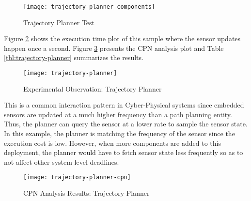 \begin{figure}[h]
	\centering
	\texttt{[image: trajectory-planner-components]}
	\caption{Trajectory Planner Test}
	\label{fig:trajectory-planner-components}
\end{figure}
\FloatBarrier

Figure \ref{fig:trajectory-planner} shows the execution time plot of this sample where the sensor updates happen once a second. Figure \ref{fig:trajectory-planner-cpn} presents the CPN analysis plot and Table \ref{tbl:trajectory-planner} summarizes the results.

\begin{figure}[h]
	\centering
	\texttt{[image: trajectory-planner]}
	\caption{Experimental Observation: Trajectory Planner}
	\label{fig:trajectory-planner}
\end{figure}
\FloatBarrier

This is a common interaction pattern in Cyber-Physical systems since embedded sensors are updated at a much higher frequency than a path planning entity. Thus, the planner can query the sensor at a lower rate to sample the sensor state. In this example, the planner is matching the frequency of the sensor since the execution cost is low. However, when more components are added to this deployment, the planner would have to fetch sensor state less frequently so as to not affect other system-level deadlines. 

\begin{figure}[h]
	\centering
	\texttt{[image: trajectory-planner-cpn]}
	\caption{CPN Analysis Results: Trajectory Planner}
	\label{fig:trajectory-planner-cpn}
\end{figure}
\FloatBarrier

